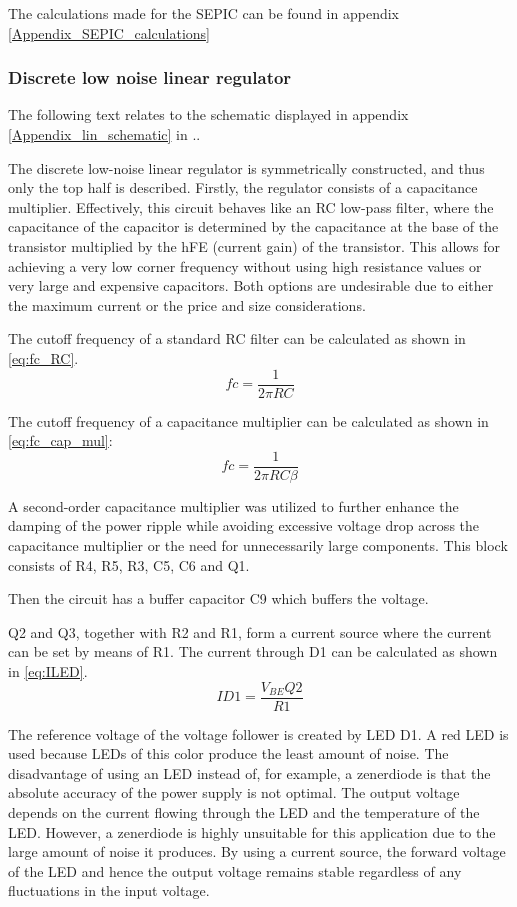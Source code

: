 The calculations made for the SEPIC can be found in appendix \ref{Appendix_SEPIC_calculations}

\subsubsection{Discrete low noise linear regulator}
The following text relates to the schematic displayed in appendix \ref{Appendix_lin_schematic} in ..

The discrete low-noise linear regulator is symmetrically constructed, and thus only the top half is described. Firstly, the regulator consists of a capacitance multiplier. Effectively, this circuit behaves like an RC low-pass filter, where the capacitance of the capacitor is determined by the capacitance at the base of the transistor multiplied by the hFE (current gain) of the transistor. This allows for achieving a very low corner frequency without using high resistance values or very large and expensive capacitors. Both options are undesirable due to either the maximum current or the price and size considerations.

The cutoff frequency of a standard RC filter can be calculated as shown in \ref{eq:fc_RC}.
\begin{equation}
    fc=\frac{1}{2 \pi R C}
    \label{eq:fc_RC}
\end{equation}

The cutoff frequency of a capacitance multiplier can be calculated as shown in \ref{eq:fc_cap_mul}:
\begin{equation}
    fc=\frac{1}{2 \pi R C \beta}
    \label{eq:fc_cap_mul}
\end{equation}

A second-order capacitance multiplier was utilized to further enhance the damping of the power ripple while avoiding excessive voltage drop across the capacitance multiplier or the need for unnecessarily large components. This block consists of R4, R5, R3, C5, C6 and Q1.

Then the circuit has a buffer capacitor C9 which buffers the voltage.

Q2 and Q3, together with R2 and R1, form a current source where the current can be set by means of R1. The current through D1 can be calculated as shown in \ref{eq:ILED}.
\begin{equation}
    ID1=\frac{V_{BE}Q2}{R1}
    \label{eq:ILED}
\end{equation}

The reference voltage of the voltage follower is created by LED D1. A red LED is used because LEDs of this color produce the least amount of noise. The disadvantage of using an LED instead of, for example, a zenerdiode is that the absolute accuracy of the power supply is not optimal. The output voltage depends on the current flowing through the LED and the temperature of the LED. However, a zenerdiode is highly unsuitable for this application due to the large amount of noise it produces. By using a current source, the forward voltage of the LED and hence the output voltage remains stable regardless of any fluctuations in the input voltage.

